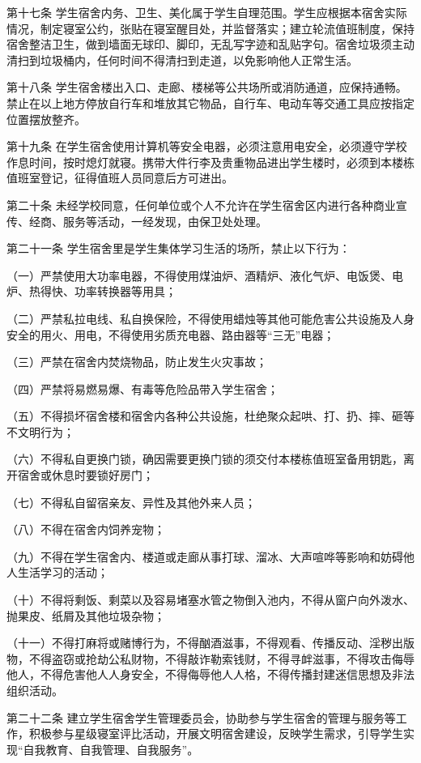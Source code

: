 \documentclass[UTF8,12pt,a4paper]{report}
\begin{document}
第十七条 学生宿舍内务、卫生、美化属于学生自理范围。学生应根据本宿舍实际情况，制定寝室公约，张贴在寝室醒目处，并监督落实；建立轮流值班制度，保持宿舍整洁卫生，做到墙面无球印、脚印，无乱写字迹和乱贴字句。宿舍垃圾须主动清扫到垃圾桶内，任何时间不得清扫到走道，以免影响他人正常生活。

第十八条 学生宿舍楼出入口、走廊、楼梯等公共场所或消防通道，应保持通畅。禁止在以上地方停放自行车和堆放其它物品，自行车、电动车等交通工具应按指定位置摆放整齐。

第十九条 在学生宿舍使用计算机等安全电器，必须注意用电安全，必须遵守学校作息时间，按时熄灯就寝。携带大件行李及贵重物品进出学生楼时，必须到本楼栋值班室登记，征得值班人员同意后方可进出。

第二十条 未经学校同意，任何单位或个人不允许在学生宿舍区内进行各种商业宣传、经商、服务等活动，一经发现，由保卫处处理。

第二十一条 学生宿舍里是学生集体学习生活的场所，禁止以下行为：

（一）严禁使用大功率电器，不得使用煤油炉、酒精炉、液化气炉、电饭煲、电炉、热得快、功率转换器等用具；

（二）严禁私拉电线、私自换保险，不得使用蜡烛等其他可能危害公共设施及人身安全的用火、用电，不得使用劣质充电器、路由器等“三无”电器；

（三）严禁在宿舍内焚烧物品，防止发生火灾事故；

（四）严禁将易燃易爆、有毒等危险品带入学生宿舍；

（五）不得损坏宿舍楼和宿舍内各种公共设施，杜绝聚众起哄、打、扔、摔、砸等不文明行为；

（六）不得私自更换门锁，确因需要更换门锁的须交付本楼栋值班室备用钥匙，离开宿舍或休息时要锁好房门；

（七）不得私自留宿亲友、异性及其他外来人员；

（八）不得在宿舍内饲养宠物；

（九）不得在学生宿舍内、楼道或走廊从事打球、溜冰、大声喧哗等影响和妨碍他人生活学习的活动；

（十）不得将剩饭、剩菜以及容易堵塞水管之物倒入池内，不得从窗户向外泼水、抛果皮、纸屑及其他垃圾杂物；

（十一）不得打麻将或赌博行为，不得酗酒滋事，不得观看、传播反动、淫秽出版物，不得盗窃或抢劫公私财物，不得敲诈勒索钱财，不得寻衅滋事，不得攻击侮辱他人，不得危害他人人身安全，不得侮辱他人人格，不得传播封建迷信思想及非法组织活动。

第二十二条 建立学生宿舍学生管理委员会，协助参与学生宿舍的管理与服务等工作，积极参与星级寝室评比活动，开展文明宿舍建设，反映学生需求，引导学生实现“自我教育、自我管理、自我服务”。
\end{document}
